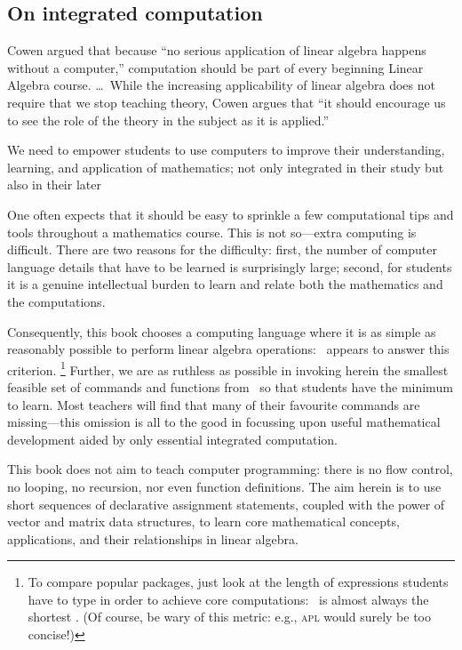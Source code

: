\subsection*{On integrated computation}

\begin{quoted}{\cite{CUPMguide2015}}%
Cowen argued that because ``no serious application of linear algebra happens without a computer,'' computation should be part of every beginning Linear Algebra course. \ldots\
While the increasing applicability of linear algebra does not require that we stop teaching theory, Cowen argues that ``it should encourage us to see the role of the theory in the subject as it is applied.''
\end{quoted}


We need to empower students to use computers to improve their understanding, learning, and application of mathematics; not only integrated in their study but also in their later 

One often expects that it should be easy to sprinkle a few computational tips and tools throughout a mathematics course.
This is not so---extra computing is difficult.
There are two reasons for the difficulty: 
first, the number of computer language details that have to be learned is surprisingly large;
second, for students it is a genuine intellectual burden to learn and relate both the mathematics and the computations.

Consequently, this book chooses a computing language where it is as simple as reasonably possible to perform linear algebra operations: \script\ appears to answer this criterion.%
\footnote{To compare popular packages, just look at the length of expressions students have to type in order to achieve core computations: \script\ is almost always the shortest \cite[e.g.,][]{Nakos1998}.  
(Of course, be wary of this metric: e.g., \textsc{apl} would surely be too concise!)}
Further, we are as ruthless as possible in invoking herein the smallest feasible set of commands and functions from \script\ so that  students have the minimum to learn.
Most teachers will find that many of their favourite commands are missing---this omission is all to the good in focussing upon useful mathematical development aided by only essential integrated computation.

This book does not aim to teach computer programming: there is no flow control, no looping, no recursion, nor even function definitions.
The aim herein is to use short sequences of declarative assignment statements, coupled with the power of vector and matrix data structures, to learn core mathematical concepts, applications, and their relationships in linear algebra. 

